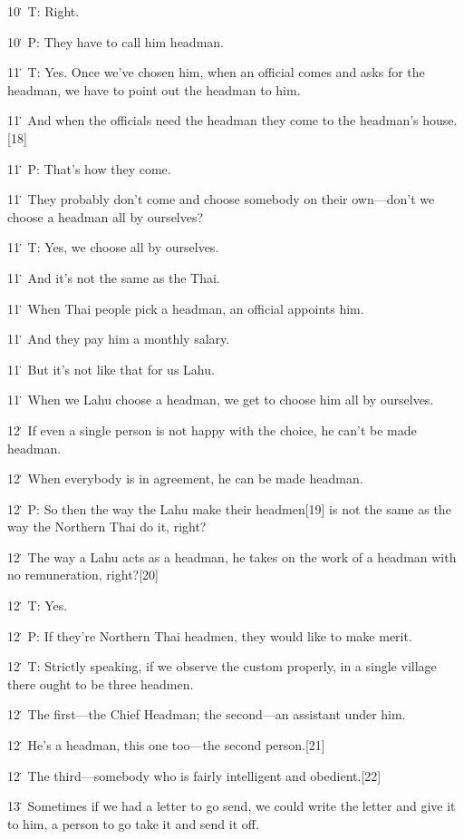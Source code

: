 {10\. T: Right.}

{10\. P: They have to call him headman.}

{11\. T: Yes. Once we've chosen him, when an official comes and asks for
the headman, we have to point out the headman to him.}

{11\. And when the officials need the headman they come to the headman's
house.[18]}

{11\. P: That's how they come.}

{11\. They probably don't come and choose somebody on their own---don't
we choose a headman all by ourselves?}

{11\. T: Yes, we choose all by ourselves.}

{11\. And it's not the same as the Thai.}

{11\. When Thai people pick a headman, an official appoints him.}

{11\. And they pay him a monthly salary.}

{11\. But it's not like that for us Lahu.}

{11\. When we Lahu choose a headman, we get to choose him all by ourselves.}

{12\. If even a single person is not happy with the choice, he can't be
made headman.}

{12\. When everybody is in agreement, he can be made headman.}

{12\. P: So then the way the Lahu make their headmen[19] is not the same
as the way the Northern Thai do it, right?}

{12\. The way a Lahu acts as a headman, he takes on the work of a headman
with no remuneration, right?[20]}

{12\. T: Yes.}

{12\. P: If they're Northern Thai headmen, they would like to make merit.}

{12\. T: Strictly speaking, if we observe the custom properly, in a single
village there ought to be three headmen.}

{12\. The first---the Chief Headman; the second---an assistant under him.}

{12\. He's a headman, this one too---the second person.[21]}

{12\. The third---somebody who is fairly intelligent and obedient.[22]}

{13\. Sometimes if we had a letter to go send, we could write the letter
and give it to him, a person to go take it and send it off.}

